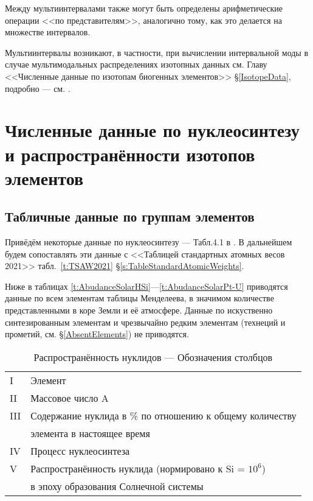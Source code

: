 \documentclass[a5paper,openany]{book}
\begin{document}
Между мультиинтервалами также могут быть определены арифметические операции 
<<по представителям>>, аналогично тому, как это делается на множестве интервалов. 

Мультиинтервалы возникают, в частности, при вычислении интервальной моды в случае мультимодальных распределениях изотопных данных см. Главу <<Численные данные по изотопам биогенных элементов>> \S\ref{IsotopeData}, подробно --- см. \cite{InteIsotopes2023}.







%
\chapter[Численные данные по нуклеосинтезу и \\распространённости изотопов элементов]
{Численные данные по нуклеосинтезу и распространённости изотопов элементов} \label{TablesIsotopesNature}

\section{Табличные данные по группам элементов}	 \label{TableNucleosynthesis}

Привёдём некоторые данные по нуклеосинтезу --- Табл.4.1 в \cite{Nucleosynthesis}. 
В дальнейшем будем сопоставлять эти данные с <<Таблицей стандартных атомных весов 2021>>
табл.~\ref{t:TSAW2021} \S\ref{s:TableStandardAtomicWeights}.

Ниже в таблицах \ref{t:AbudanceSolarHSi}---\ref{t:AbudanceSolarPt-U} приводятся данные по всем элементам таблицы Менделеева, в значимом количестве представленными в коре Земли и её атмосфере.
Данные по искуственно синтезированным элементам и чрезвычайно редким элементам (технеций и прометий, см. \S\ref{AbsentElements}) не приводятся.

\begin{table}[h!]
	{ 
		\begin{tabular}{ll}
			I & Элемент \\
			II & Массовое число A \\	
			III & Содержание нуклида в \% по отношению к общему количеству \\
			& элемента в настоящее время \\
			IV & Процесс нуклеосинтеза  \\
			V & Распространённость нуклида (нормировано к Si = $10^6$)  \\
			& в эпоху образования Солнечной системы		
		\end{tabular}
	}
	\caption{Распространённость нуклидов  --- Обозначения столбцов}
	\label{t:AbudancesSolarNotes}
\end{table}
\end{document}
